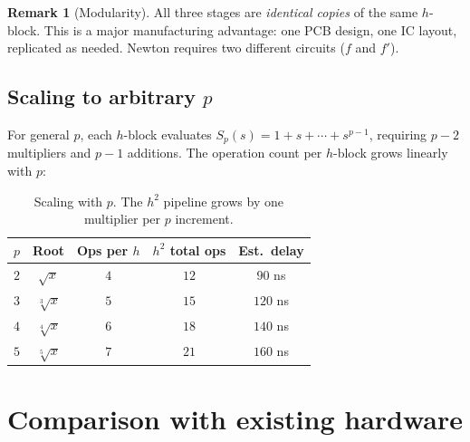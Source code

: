 \documentclass[11pt,a4paper]{article}
\theoremstyle{definition}
\newtheorem{remark}{Remark}[section]
\newcommand{\cbrt}[1]{\sqrt[3]{#1}}
\newcommand{\prt}[2]{\sqrt[#1]{#2}}
\begin{document}
\begin{remark}[Modularity]
All three stages are \emph{identical copies} of the same $h$-block.  This is a major manufacturing advantage: one PCB design, one IC layout, replicated as needed.  Newton requires two different circuits ($f$ and $f'$).
\end{remark}

\subsection{Scaling to arbitrary $p$}

For general $p$, each $h$-block evaluates $S_p(s) = 1 + s + \cdots + s^{p-1}$, requiring $p-2$ multipliers and $p-1$ additions.  The operation count per $h$-block grows linearly with $p$:

\begin{table}[H]
\centering
\begin{tabular}{ccccc}
\toprule
$p$ & Root & Ops per $h$ & $h^2$ total ops & Est.\ delay \\
\midrule
$2$ & $\sqrt{x}$ & $4$ & $12$ & $90$ ns \\
$3$ & $\cbrt{x}$ & $5$ & $15$ & $120$ ns \\
$4$ & $\prt{4}{x}$ & $6$ & $18$ & $140$ ns \\
$5$ & $\prt{5}{x}$ & $7$ & $21$ & $160$ ns \\
\bottomrule
\end{tabular}
\caption{Scaling with $p$.  The $h^2$ pipeline grows by one multiplier per $p$ increment.}
\label{tab:p_scaling}
\end{table}

\section{Comparison with existing hardware}
\label{sec:comparison}
\end{document}
